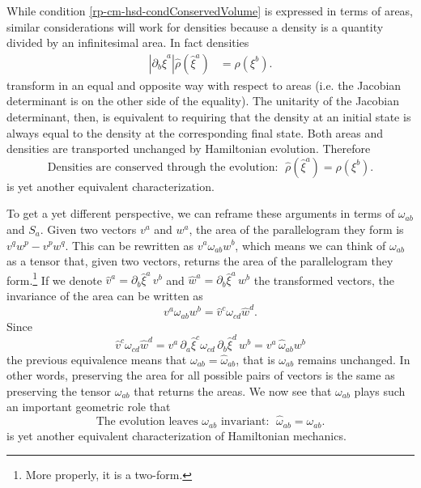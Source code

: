 While condition \ref{rp-cm-hsd-condConservedVolume} is expressed in terms of areas, similar considerations will work for densities because a density is a quantity divided by an infinitesimal area. In fact densities
\begin{equation}\label{rp-cm-densityTransformation1d}
	\begin{aligned}
		\left| \partial_b \hat{\xi}^a \right| \hat{\rho}(\hat{\xi}^a) &= \rho(\xi^b).
	\end{aligned}	
\end{equation}
transform in an equal and opposite way with respect to areas (i.e. the Jacobian determinant is on the other side of the equality). The unitarity of the Jacobian determinant, then, is equivalent to requiring that the density at an initial state is always equal to the density at the corresponding final state. Both areas and densities are transported unchanged by Hamiltonian evolution. Therefore
\begin{equation}\label{rp-cm-hsd-condConservedDensity}
	\tag{HM-5}
	\text{Densities are conserved through the evolution: } \; \hat{\rho}(\hat{\xi}^a) = \rho(\xi^b).
\end{equation}
is yet another equivalent characterization.

To get a yet different perspective, we can reframe these arguments in terms of $\omega_{ab}$ and $S_a$. Given two vectors $v^a$ and $w^a$, the area of the parallelogram they form is $v^q w^p - v^p w^q$. This can be rewritten as $v^a \omega_{ab} w^b$, which means we can think of $\omega_{ab}$ as a tensor that, given two vectors, returns the area of the parallelogram they form.\footnote{More properly, it is a two-form.} If we denote $\hat{v}^a = \partial_b \hat{\xi}^a \, v^b$ and $\hat{w}^a = \partial_b \hat{\xi}^a \, w^b$ the transformed vectors, the invariance of the area can be written as
\begin{equation}
	v^a \omega_{ab} w^b = \hat{v}^c \omega_{cd} \hat{w}^d.
\end{equation}
Since
\begin{equation}
	\hat{v}^c \omega_{cd} \hat{w}^d = v^a \, \partial_a \hat{\xi}^c \omega_{cd} \, \partial_b \hat{\xi}^d \, w^b = v^a \, \hat{\omega}_{ab} w^b
\end{equation}
the previous equivalence means that $\omega_{ab} = \hat{\omega}_{ab}$, that is $\omega_{ab}$ remains unchanged. In other words, preserving the area for all possible pairs of vectors is the same as preserving the tensor $\omega_{ab}$ that returns the areas. We now see that $\omega_{ab}$ plays such an important geometric role that
\begin{equation}\label{rp-cm-hsd-condConservedSymplectic}
	\tag{HM-6}
	\text{The evolution leaves $\omega_{ab}$ invariant: } \; \hat{\omega}_{ab} = \omega_{ab}.
\end{equation}
is yet another equivalent characterization of Hamiltonian mechanics.


